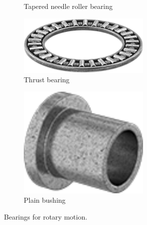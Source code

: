 \documentclass[10pt,letterpaper]{book}
\begin{document}
\begin{figure}[H]
\begin{subfigure}[b]{.32\linewidth}
			\caption{Tapered needle roller bearing}
		\end{subfigure}
		\begin{subfigure}[b]{.32\linewidth}
			\includegraphics[width=0.7\textwidth]{imgs/thrustbearing.png}
			\caption{Thrust bearing}
		\end{subfigure}
		\begin{subfigure}[b]{.32\linewidth}
			\includegraphics[width=0.7\textwidth]{imgs/plainbushing.png}
			\caption{Plain bushing}
		\end{subfigure}
		
		\caption{Bearings for rotary motion.}
	\end{figure}
	
\end{document}
